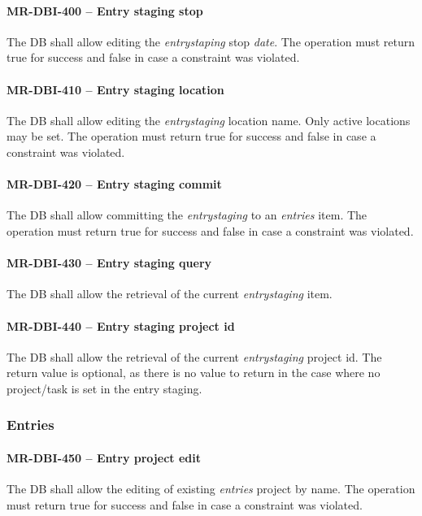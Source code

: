 \paragraph{MR-DBI-400 -- Entry staging stop}
The \gls{DB} shall allow editing the \emph{entrystaping} stop \emph{date}.
The operation must return true for success and false in case a
constraint was violated.

\paragraph{MR-DBI-410 -- Entry staging location}
The \gls{DB} shall allow editing the \emph{entrystaging} location name.
Only active locations may be set.
The operation must return true for success and false in case a
constraint was violated.

\paragraph{MR-DBI-420 -- Entry staging commit}
The \gls{DB} shall allow committing the \emph{entrystaging} to an
\emph{entries} item.
The operation must return true for success and false in case a
constraint was violated.

\paragraph{MR-DBI-430 -- Entry staging query}
The \gls{DB} shall allow the retrieval of the current \emph{entrystaging} item.

\paragraph{MR-DBI-440 -- Entry staging project id}
The \gls{DB} shall allow the retrieval of the current \emph{entrystaging}
project id. The return value is optional, as there is no value to
return in the case where no project/task is set in the entry staging.

\subsubsection{Entries}
\paragraph{MR-DBI-450 -- Entry project edit}
The \gls{DB} shall allow the editing of existing \emph{entries} project
by name.
The operation must return true for success and false in case a
constraint was violated.

